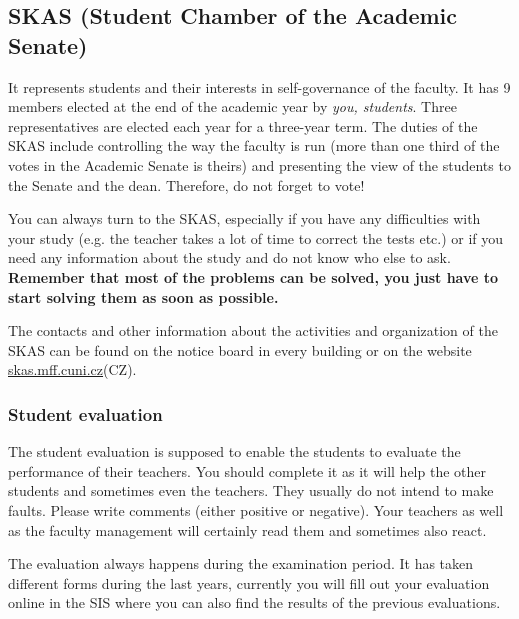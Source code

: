 \subsection[SKAS]{SKAS (Student Chamber of the Academic Senate)}
It represents students and their interests in self-governance of the faculty.
It has 9 members elected at the end of the academic year by \textit{you,
students}. Three representatives are elected each year for a three-year term.
The duties of the SKAS include controlling the way the faculty is run (more than
one third of the votes in the Academic Senate is theirs) and presenting the view
of the students to the Senate and the dean.
Therefore, do not forget to vote!

You can always turn to the SKAS, especially if you have any difficulties with
your study (e.g. the teacher takes a lot of time to correct the tests etc.) or
if you need any information about the study and do not know who else to ask.
\textbf{Remember that most of the problems can be solved, you just have to start
solving them as soon as possible.}

The contacts and other information about the activities and organization of the
SKAS can be found on the notice board in every building or on the website
\url{skas.mff.cuni.cz}(CZ).

\subsubsection{Student evaluation}
The student evaluation is supposed to enable the students to evaluate the
performance of their teachers.
You should complete it as it will help the other students and sometimes even the
teachers. They usually do not intend to make faults.
Please write comments (either positive or negative). Your teachers as
well as the faculty management will certainly read them and sometimes also
react.

The evaluation always happens during the examination period. It has taken
different forms during the last years, currently you will fill out your
evaluation online in the SIS where you can also find the results of the previous
evaluations.